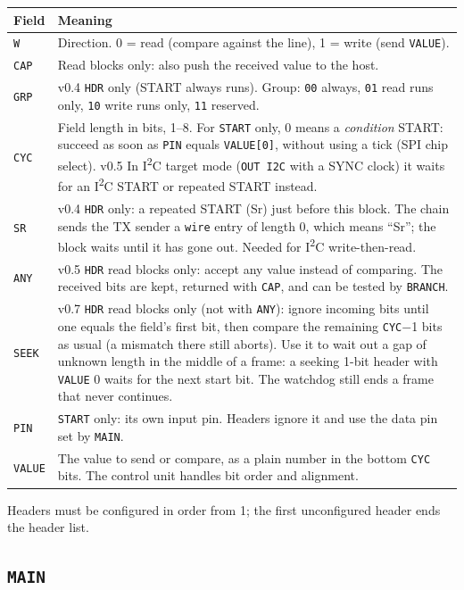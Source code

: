 \documentclass[11pt,a4paper]{article}
\newcommand{\new}{\textcolor{newc}{\textsf{\small v0.4}}}
\newcommand{\vfive}{\textcolor{fivec}{\textsf{\small v0.5}}}
\newcommand{\vseven}{\textcolor{sevenc}{\textsf{\small v0.7}}}
\newcommand{\sig}[1]{\texttt{#1}}
\begin{document}
\begin{tabularx}{\linewidth}{@{}l>{\raggedright\arraybackslash}X@{}}
\toprule
Field & Meaning \\
\midrule
\sig{W} & Direction. 0 = read (compare against the line), 1 = write (send \sig{VALUE}). \\
\sig{CAP} & Read blocks only: also push the received value to the host. \\
\sig{GRP} & \new{} \sig{HDR} only (START always runs). Group: \texttt{00} always, \texttt{01} read runs only, \texttt{10} write runs only, \texttt{11} reserved. \\
\sig{CYC} & Field length in bits, 1--8. For \sig{START} only, 0 means a \emph{condition} START: succeed as soon as \sig{PIN} equals \sig{VALUE[0]}, without using a tick (SPI chip select). \vfive{} In I\textsuperscript{2}C target mode (\sig{OUT I2C} with a SYNC clock) it waits for an I\textsuperscript{2}C START or repeated START instead. \\
\sig{SR} & \new{} \sig{HDR} only: a repeated START (Sr) just before this block. The chain sends the TX sender a \sig{wire} entry of length 0, which means ``Sr''; the block waits until it has gone out. Needed for I\textsuperscript{2}C write-then-read. \\
\sig{ANY} & \vfive{} \sig{HDR} read blocks only: accept any value instead of comparing. The received bits are kept, returned with \sig{CAP}, and can be tested by \sig{BRANCH}. \\
\sig{SEEK} & \vseven{} \sig{HDR} read blocks only (not with \sig{ANY}): ignore incoming bits until one equals the field's first bit, then compare the remaining \sig{CYC}$-$1 bits as usual (a mismatch there still aborts). Use it to wait out a gap of unknown length in the middle of a frame: a seeking 1-bit header with \sig{VALUE} 0 waits for the next start bit. The watchdog still ends a frame that never continues. \\
\sig{PIN} & \sig{START} only: its own input pin. Headers ignore it and use the data pin set by \sig{MAIN}. \\
\sig{VALUE} & The value to send or compare, as a plain number in the bottom \sig{CYC} bits. The control unit handles bit order and alignment. \\
\bottomrule
\end{tabularx}

Headers must be configured in order from 1; the first unconfigured header ends the header list.

\subsection{\sig{MAIN}}
\end{document}
